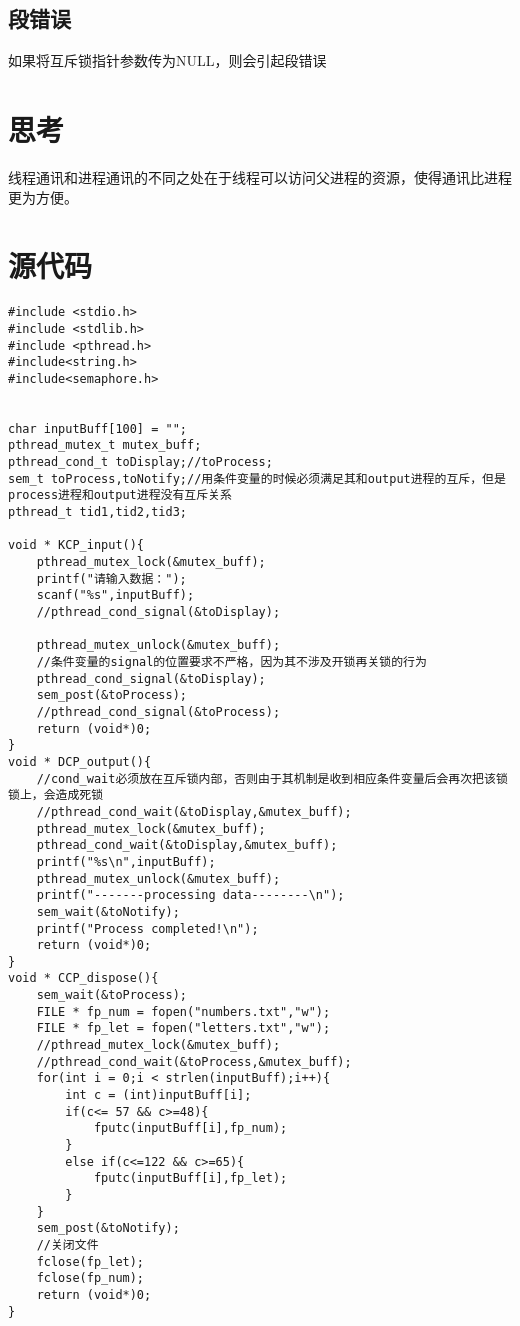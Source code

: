 \documentclass[UTF8]{ctexart}
\begin{document}
        \subsection{段错误}
        如果将互斥锁指针参数传为NULL，则会引起段错误

\section{思考}
线程通讯和进程通讯的不同之处在于线程可以访问父进程的资源，使得通讯比进程更为方便。

        \section{源代码}
        \begin{lstlisting}
#include <stdio.h>
#include <stdlib.h>
#include <pthread.h>
#include<string.h>
#include<semaphore.h>


char inputBuff[100] = "";
pthread_mutex_t mutex_buff;
pthread_cond_t toDisplay;//toProcess;
sem_t toProcess,toNotify;//用条件变量的时候必须满足其和output进程的互斥，但是process进程和output进程没有互斥关系
pthread_t tid1,tid2,tid3;

void * KCP_input(){
    pthread_mutex_lock(&mutex_buff);
    printf("请输入数据：");
    scanf("%s",inputBuff);
    //pthread_cond_signal(&toDisplay);

    pthread_mutex_unlock(&mutex_buff);
    //条件变量的signal的位置要求不严格，因为其不涉及开锁再关锁的行为
    pthread_cond_signal(&toDisplay);
    sem_post(&toProcess);
    //pthread_cond_signal(&toProcess);
    return (void*)0;
}
void * DCP_output(){    
    //cond_wait必须放在互斥锁内部，否则由于其机制是收到相应条件变量后会再次把该锁锁上，会造成死锁
    //pthread_cond_wait(&toDisplay,&mutex_buff);
    pthread_mutex_lock(&mutex_buff);
    pthread_cond_wait(&toDisplay,&mutex_buff);
    printf("%s\n",inputBuff);
    pthread_mutex_unlock(&mutex_buff);
    printf("-------processing data--------\n");
    sem_wait(&toNotify);
    printf("Process completed!\n");
    return (void*)0;
}
void * CCP_dispose(){
    sem_wait(&toProcess);
    FILE * fp_num = fopen("numbers.txt","w");
    FILE * fp_let = fopen("letters.txt","w");
    //pthread_mutex_lock(&mutex_buff);
    //pthread_cond_wait(&toProcess,&mutex_buff);
    for(int i = 0;i < strlen(inputBuff);i++){
        int c = (int)inputBuff[i];
        if(c<= 57 && c>=48){
            fputc(inputBuff[i],fp_num);
        }
        else if(c<=122 && c>=65){
            fputc(inputBuff[i],fp_let);
        }
    }
    sem_post(&toNotify);
    //关闭文件
    fclose(fp_let);
    fclose(fp_num);
    return (void*)0;
}


\end{lstlisting}
\end{document}
